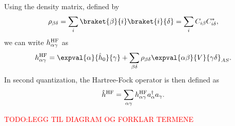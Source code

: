 Using the density matrix, defined by
\begin{equation*}
    \rho_{\beta\delta} = \sum_{i} \braket{\beta}{i} \braket{i}{\delta} = \sum_{i} C_{i\beta} C_{i\delta}^*,
\end{equation*}
we can write $h_{\alpha \gamma}^{\mathrm{HF}}$ as
\begin{equation*}
    h_{\alpha \gamma}^\HF = \expval{\alpha}{\hat{h}_0}{\gamma} + \sum_{\beta\delta} \rho_{\beta\delta} \expval{\alpha\beta}{V}{\gamma\delta}_{AS}.
\end{equation*}
In second quantization, the Hartree-Fock operator is then defined as
\begin{equation*}
    \hat{h}^{\mathrm{HF}} = \sum_{\alpha\gamma} h_{\alpha\gamma}^{\mathrm{HF}} a_\alpha^\dagger a_\gamma.
\end{equation*}

\textcolor{red}{TODO:\@ LEGG TIL DIAGRAM OG FORKLAR TERMENE}
